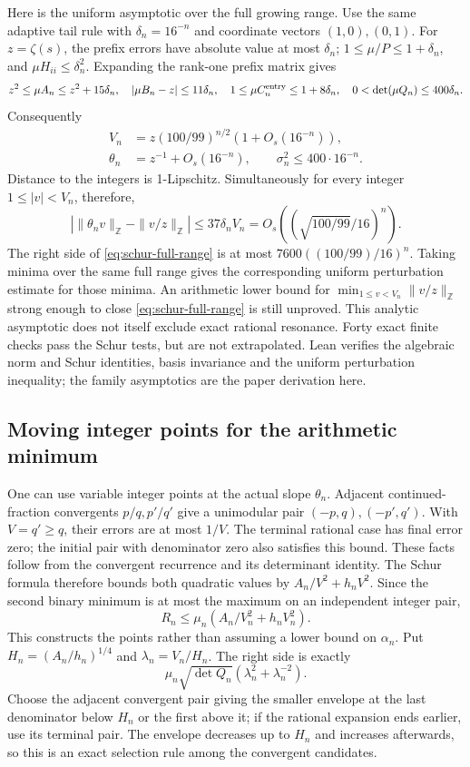 \documentclass[11pt]{article}
\theoremstyle{remark}
\newcommand{\Z}{\mathbb Z}
\begin{document}
Here is the uniform asymptotic over the full growing range. Use the same
adaptive tail rule with \(\delta_n=16^{-n}\) and coordinate vectors
\((1,0),(0,1)\). For \(z=\zeta(s)\), the prefix errors have absolute
value at most \(\delta_n\); \(1\le\mu/P\le1+\delta_n\), and
\(\mu H_{ii}\le\delta_n^2\). Expanding the rank-one prefix matrix gives
\[
 z^2\le\mu A_n\le z^2+15\delta_n,\quad
 |\mu B_n-z|\le11\delta_n,\quad
 1\le\mu C_n^{\rm entry}\le1+8\delta_n,\quad
 0<\det(\mu Q_n)\le400\delta_n.
\]
Consequently
\begin{align*}
 V_n&=z(100/99)^{n/2}(1+O_s(16^{-n})),\\
 \theta_n&=z^{-1}+O_s(16^{-n}),\qquad
 \sigma_n^2\le400\cdot16^{-n}.
\end{align*}
Distance to the integers is 1-Lipschitz. Simultaneously for every integer
\(1\le|v|<V_n\), therefore,
\[
 \left|\|\theta_nv\|_{\Z}-\|v/z\|_{\Z}\right|
 \le37\delta_nV_n
 =O_s\left((\sqrt{100/99}/16)^n\right).
\]
The right side of \eqref{eq:schur-full-range} is at most
\(7600((100/99)/16)^n\). Taking minima over the same full range gives
the corresponding uniform perturbation estimate for those minima.
An arithmetic lower bound for \(\min_{1\le v<V_n}\|v/z\|_{\Z}\)
strong enough to close \eqref{eq:schur-full-range} is still unproved.
This analytic asymptotic does not itself exclude exact rational resonance.
Forty exact finite checks pass the Schur tests, but are not extrapolated.
Lean verifies the algebraic norm and Schur identities, basis invariance
and the uniform perturbation inequality; the family asymptotics are the
paper derivation here.

\subsection{Moving integer points for the arithmetic minimum}
One can use variable integer points at the actual slope \(\theta_n\).
Adjacent continued-fraction convergents \(p/q,p'/q'\) give a unimodular
pair \((-p,q),(-p',q')\). With \(V=q'\ge q\), their errors are at most
\(1/V\). The terminal rational case has final error zero; the initial
pair with denominator zero also satisfies this bound. These facts
follow from the convergent recurrence and its determinant identity.
The Schur formula therefore bounds both quadratic values by
\(A_n/V^2+h_nV^2\). Since the second binary minimum is at most the
maximum on an independent integer pair,
\begin{equation}
 R_n\le\mu_n(A_n/V_n^2+h_nV_n^2).
 \label{eq:variable-point-cost}
\end{equation}
This constructs the points rather than assuming a lower bound on
\(\alpha_n\). Put \(H_n=(A_n/h_n)^{1/4}\) and
\(\lambda_n=V_n/H_n\). The right side is exactly
\[
 \mu_n\sqrt{\det Q_n}(\lambda_n^2+\lambda_n^{-2}).
\]
Choose the adjacent convergent pair giving the smaller envelope at the
last denominator below \(H_n\) or the first above it; if the rational
expansion ends earlier, use its terminal pair. The envelope decreases
up to \(H_n\) and increases afterwards, so this is an exact selection
rule among the convergent candidates.
\end{document}
